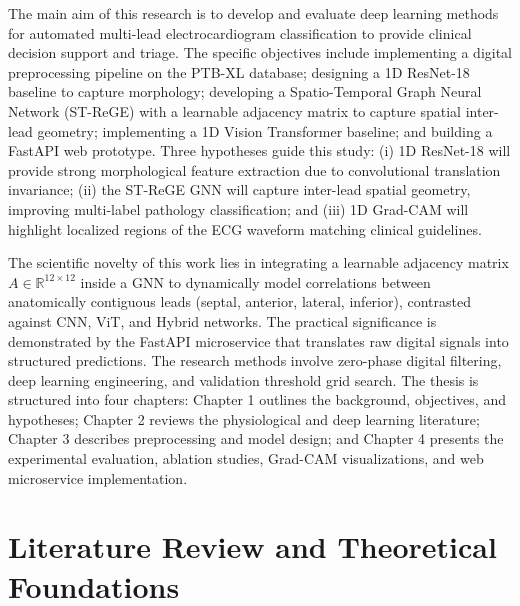 \documentclass[12pt,a4paper]{report}
\begin{document}
The main aim of this research is to develop and evaluate deep learning methods for automated multi-lead electrocardiogram classification to provide clinical decision support and triage. The specific objectives include implementing a digital preprocessing pipeline on the PTB-XL database; designing a 1D ResNet-18 baseline to capture morphology; developing a Spatio-Temporal Graph Neural Network (ST-ReGE) with a learnable adjacency matrix to capture spatial inter-lead geometry; implementing a 1D Vision Transformer baseline; and building a FastAPI web prototype. Three hypotheses guide this study: (i) 1D ResNet-18 will provide strong morphological feature extraction due to convolutional translation invariance; (ii) the ST-ReGE GNN will capture inter-lead spatial geometry, improving multi-label pathology classification; and (iii) 1D Grad-CAM will highlight localized regions of the ECG waveform matching clinical guidelines.

The scientific novelty of this work lies in integrating a learnable adjacency matrix $A \in \mathbb{R}^{12 \times 12}$ inside a GNN to dynamically model correlations between anatomically contiguous leads (septal, anterior, lateral, inferior), contrasted against CNN, ViT, and Hybrid networks. The practical significance is demonstrated by the FastAPI microservice that translates raw digital signals into structured predictions. The research methods involve zero-phase digital filtering, deep learning engineering, and validation threshold grid search. The thesis is structured into four chapters: Chapter 1 outlines the background, objectives, and hypotheses; Chapter 2 reviews the physiological and deep learning literature; Chapter 3 describes preprocessing and model design; and Chapter 4 presents the experimental evaluation, ablation studies, Grad-CAM visualizations, and web microservice implementation.

\clearpage

\chapter{Literature Review and Theoretical Foundations}
\end{document}
